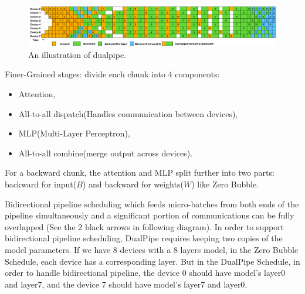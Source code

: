 \begin{figure}[t]
	\centering
	\includegraphics[scale=0.45]{./images/dualpipe.png}
	\caption{An illustration of dualpipe.}
\end{figure}
Finer-Grained stages: divide each chunk into 4 components: 
\begin{itemize}
	\item Attention, 
	\item All-to-all dispatch(Handles communication between devices), 
	\item MLP(Multi-Layer Perceptron), 
	\item All-to-all combine(merge output across devices).
\end{itemize}
 For a backward chunk, the attention and MLP split further into two parts: backward for input($B$) and backward for weights($W$) like Zero Bubble.

Bidirectional pipeline scheduling which feeds micro-batches from both ends of the pipeline simultaneously and a significant portion of communications can be fully overlapped (See the 2 black arrows in following diagram). In order to support bidirectional pipeline scheduling, DualPipe requires keeping two copies of the model parameters. If we have 8 devices with a 8 layers model, in the Zero Bubble Schedule, each device has a corresponding layer. But in the DualPipe Schedule, in order to handle bidirectional pipeline, the device 0 should have model's layer0 and layer7, and the device 7 should have model's layer7 and layer0.

